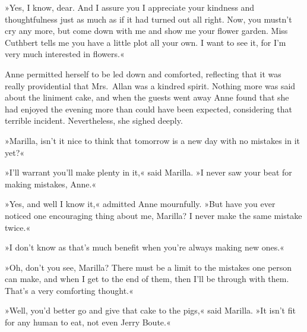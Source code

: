 »Yes, I know, dear. And I assure you I appreciate your kindness and thoughtfulness just as much as if it had turned out all right. Now, you mustn't cry any more, but come down with me and show me your flower garden. Miss Cuthbert tells me you have a little plot all your own. I want to see it, for I'm very much interested in flowers.«

Anne permitted herself to be led down and comforted, reflecting that it was really providential that Mrs.~Allan was a kindred spirit. Nothing more was said about the liniment cake, and when the guests went away Anne found that she had enjoyed the evening more than could have been expected, considering that terrible incident. Nevertheless, she sighed deeply.

»Marilla, isn't it nice to think that tomorrow is a new day with no mistakes in it yet?«

»I'll warrant you'll make plenty in it,« said Marilla. »I never saw your beat for making mistakes, Anne.«

»Yes, and well I know it,« admitted Anne mournfully. »But have you ever noticed one encouraging thing about me, Marilla? I never make the same mistake twice.«

»I don't know as that's much benefit when you're always making new ones.«

»Oh, don't you see, Marilla? There must be a limit to the mistakes one person can make, and when I get to the end of them, then I'll be through with them. That's a very comforting thought.«

»Well, you'd better go and give that cake to the pigs,« said Marilla. »It isn't fit for any human to eat, not even Jerry Boute.«